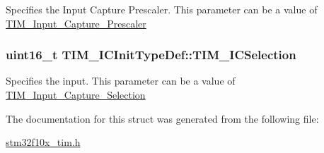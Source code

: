 \label{structTIM__ICInitTypeDef_ac61c7fc999ace295ac81b304cabd61e0}
Specifies the Input Capture Prescaler. This parameter can be a value of \hyperlink{group__TIM__Input__Capture__Prescaler}{TIM\_\-Input\_\-Capture\_\-Prescaler} \hypertarget{structTIM__ICInitTypeDef_a00b9a72e895a43dc18c69c96a149f080}{
\subsubsection[{TIM\_\-ICSelection}]{\setlength{\rightskip}{0pt plus 5cm}uint16\_\-t {\bf TIM\_\-ICInitTypeDef::TIM\_\-ICSelection}}}
\label{structTIM__ICInitTypeDef_a00b9a72e895a43dc18c69c96a149f080}
Specifies the input. This parameter can be a value of \hyperlink{group__TIM__Input__Capture__Selection}{TIM\_\-Input\_\-Capture\_\-Selection} 

The documentation for this struct was generated from the following file:\begin{DoxyCompactItemize}
\item 
\hyperlink{stm32f10x__tim_8h}{stm32f10x\_\-tim.h}\end{DoxyCompactItemize}
